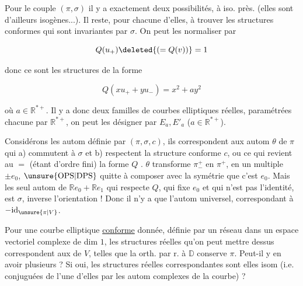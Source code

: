 Pour le couple $(\pi,\sigma)$ il y a exactement deux possibilités, à iso. près.  (elles sont d'ailleurs isogènes...). Il reste, pour chacune d'elles, à trouver les structures conformes qui sont invariantes par $\sigma$. On peut les normaliser par 

\[
Q(u_+)\deleted{(=Q(v))}=1
\]


donc ce sont les structures de la forme

\[
Q(xu_++yu_-)=x^2+ay^2
\]

où $a\in\mathbb R^{*+}$. Il y a donc deux familles de courbes elliptiques réelles, paramétrées chacune par $\mathbb R^{*+}$, on peut les désigner par $E_a,E'_a$ ($a\in\mathbb R^{*+}$). 

Considérons les autom   définie par $(\pi,\sigma,c)$, ils correspondent aux  autom $\theta$ de $\pi$ qui a) commutent à $\sigma$ et b) respectent la structure conforme  $c$,  ou ce qui revient au $=$ (étant d'ordre fini) la forme $Q$ .  $\theta$ transforme $\pi^{+}_{-}$ en $\pi^{+}$,    en un multiple  $\pm e_0$, $\unsure{\mathrm{OPS}|\mathrm{DPS}}$ quitte à composer avec la symétrie  que c'est $e_0$. Mais les seul autom de $\mathbb R e_0+\mathbb R e_1$ qui respecte $Q$, qui fixe $e_0$ et qui n'est pas l'identité, est $\sigma$,   inverse l'orientation ! Donc il n'y a que l'autom universel, correspondant à $-\mathrm{id}_{\unsure{\pi|V}}$.


Pour une courbe elliptique \uline{conforme} donnée, définie par un réseau \inserted{$\pi$} dans un espace vectoriel complexe  de dim $1$, les structures réelles qu'on peut mettre dessus correspondent aux   de $V$, telles que la   orth. par r. à $\mathbb D$ conserve $\pi$. Peut-il y en avoir plusieurs ? Si oui, les structures réelles correspondantes sont elles isom (i.e. conjuguées de l'une d'elles par les autom complexes de la courbe) ?

